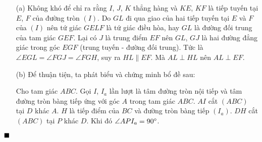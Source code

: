 \documentclass{article} %
\newenvironment{solution}[1][Lời giải]{%
  \proof[\faPenNib \hspace{0.2cm} \ttfamily \scshape \large #1]%
}{\(\hfill \blacksquare\){\parfillskip0pt\par}}
\begin{document}
        \begin{solution}
            \hfill
            \begin{enumerate}
                \item[(a)] Không khó để chỉ ra rằng \(I\), \(J\), \(K\) thẳng hàng và \(KE\), \(KF\) là tiếp tuyến tại \(E\), \(F\) của đường tròn \((I)\). Do \(GL\) đi qua giao của hai tiếp tuyến tại \(E\) và \(F\) của \((I)\) nên tứ giác \(GELF\) là tứ giác điều hòa, hay \(GL\) là đường đối trung của tam giác \(GEF\). Lại có \(J\) là trung điểm \(EF\) nên \(GL\), \(GJ\) là hai đường đẳng giác trong góc \(EGF\) (trung tuyến - đường đối trung). Tức là \(\angle EGL = \angle FGJ = \angle FGH\), suy ra \(HL \parallel EF\). Mà \(AL \perp HL\) nên \(AL \perp EF\).
                \item[(b)] Để thuận tiện, ta phát biểu và chứng minh bổ đề sau:
                \begin{lemma}
                    Cho tam giác \(ABC\). Gọi \(I\), \(I_a\) lần lượt là tâm đường tròn nội tiếp và tâm đường tròn bàng tiếp ứng với góc \(A\) trong tam giác \(ABC\). \(AI\) cắt \((ABC)\) tại \(D\) khác \(A\). \(H\) là tiếp điểm của \(BC\) và đường tròn bàng tiếp \((I_a)\). \(DH\) cắt \((ABC)\) tại \(P\) khác \(D\). Khi đó \(\angle API_a = 90 \degree\).
                \end{lemma}
                \begin{center}
\end{center}
\end{enumerate}
\end{solution}
\end{document}
